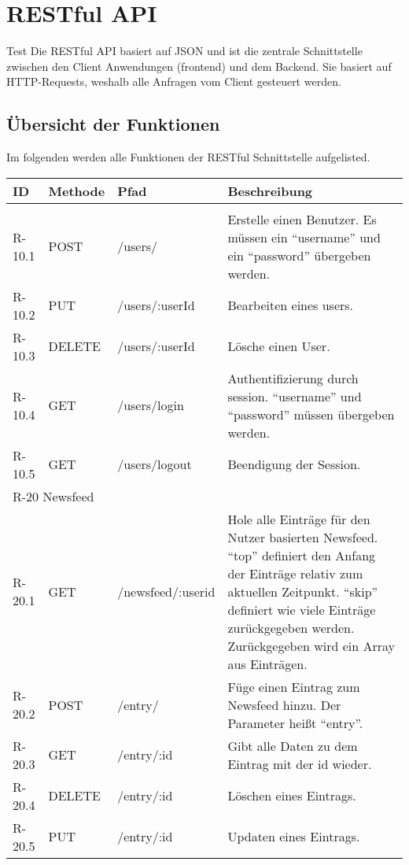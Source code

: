 \chapter{RESTful API}
Test
Die RESTful API basiert auf JSON und ist die zentrale Schnittstelle zwischen den Client Anwendungen (frontend) und dem Backend.
Sie basiert auf HTTP-Requests, weshalb alle Anfragen vom Client gesteuert werden.

\section{Übersicht der Funktionen}
Im folgenden werden alle Funktionen der RESTful Schnittstelle aufgelisted. 
\begin{tabularx}{\textwidth}{|l|l|l|X|}
    \toprule
    \textbf{ID} & \textbf{Methode} & \textbf{Pfad} & \textbf{Beschreibung} \\
    \midrule
    \endhead
    \hline
    \caption{RESTful Pfade}
    \label{RESTful:pfade}
    \endfoot

    \multicolumn{4}{|l|}{R-10 Userverwaltung}\\
    \hline

    R-10.1 & POST & /users/ & Erstelle einen Benutzer. Es müssen ein \enquote{username} und ein \enquote{password} übergeben werden.\\
    R-10.2 & PUT & /users/:userId & Bearbeiten eines users.\\
    R-10.3 & DELETE & /users/:userId & Lösche einen User.\\
    R-10.4 & GET & /users/login & Authentifizierung durch session. \enquote{username} und \enquote{password} müssen übergeben werden.\\
    R-10.5 & GET & /users/logout & Beendigung der Session.\\

    \hline
    \multicolumn{4}{|l|}{R-20 Newsfeed}\\
    \hline

    R-20.1 & GET & /newsfeed/:userid & Hole alle Einträge für den Nutzer basierten Newsfeed. \enquote{top} definiert den Anfang der Einträge relativ zum aktuellen Zeitpunkt. \enquote{skip} definiert wie viele Einträge zurückgegeben werden. Zurückgegeben wird ein Array aus Einträgen.\\ 
    R-20.2 & POST & /entry/ & Füge einen Eintrag zum Newsfeed hinzu. Der Parameter heißt \enquote{entry}.\\ 
    R-20.3 & GET & /entry/:id & Gibt alle Daten zu dem Eintrag mit der id wieder.\\
    R-20.4 & DELETE & /entry/:id & Löschen eines Eintrags.\\
    R-20.5 & PUT & /entry/:id & Updaten eines Eintrags.\\


\end{tabularx}
